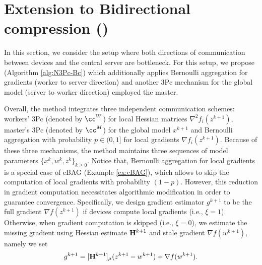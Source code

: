 \documentclass[11pt]{article}
\begin{document}
	\section{Extension to Bidirectional compression ()}\label{sec:N3Pc-Bc}
	
	In this section, we consider the setup where both directions of communication between devices and the central server are bottleneck. For this setup, we propose  (Algorithm \ref{alg:N3Pc-Bc}) which additionally applies Bernoulli aggregation for gradients (worker to server direction) and another 3Pc mechanism for the global model (server to worker direction) employed the master.
	
	Overall, the method integrates three independent communication schemes: workers' 3Pc (denoted by $\cc^W$) for local Hessian matrices $\nabla^2 f_i(z^{k+1})$, master's 3Pc (denoted by $\cc^M$) for the global model $x^{k+1}$ and Bernoulli aggregation with probability $p\in(0,1]$ for local gradients $\nabla f_i(z^{k+1})$. Because of these three mechanisms, the method maintains three sequences of model parameters $\{x^k,w^k,z^k\}_{k\ge0}$. Notice that, Bernoulli aggregation for local gradients is a special case of cBAG (Example \ref{ex:cBAG}), which allows to skip the computation of local gradients with probability $(1-p)$. However, this reduction in gradient computation necessitates algorithmic modification in order to guarantee convergence. Specifically, we design gradient estimator $g^{k+1}$ to be the full gradient $\nabla f(z^{k+1})$ if devices compute local gradients (i.e., $\xi=1$). Otherwise, when gradient computation is skipped (i.e., $\xi=0$), we estimate the missing gradient using Hessian estimate $\mathbf{H}^{k+1}$ and stale gradient $\nabla f(w^{k+1})$, namely we set $$g^{k+1} = [\mathbf{H}^{k+1}]_{\mu}(z^{k+1}-w^{k+1}) + \nabla f(w^{k+1}).$$
	
	
	
\end{document}
